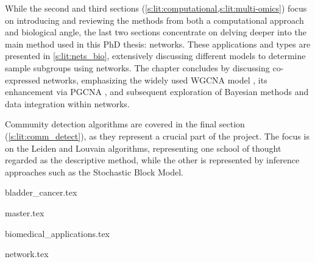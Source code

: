 While the second and third sections (\cref{s:lit:computational,s:lit:multi-omics}) focus on introducing and reviewing the methods from both a computational approach and biological angle, the last two sections concentrate on delving deeper into the main method used in this PhD thesis: networks. These applications and types are presented in \cref{s:lit:nets_bio}, extensively discussing different models to determine sample subgroups using networks. The chapter concludes by discussing co-expressed networks, emphasizing the widely used WGCNA model \citep{Langfelder2008-sn}, its enhancement via PGCNA \citep{Care2019-ij}, and subsequent exploration of Bayesian methods and data integration within networks.

Community detection algorithms are covered in the final section (\cref{s:lit:comm_detect}), as they represent a crucial part of the project. The focus is on the Leiden and Louvain algorithms, representing one school of thought regarded as the descriptive method, while the other is represented by inference approaches such as the Stochastic Block Model.



{bladder_cancer.tex}

\pagebreak

{master.tex}

\newpage

{biomedical_applications.tex}


\pagebreak

{network.tex}



